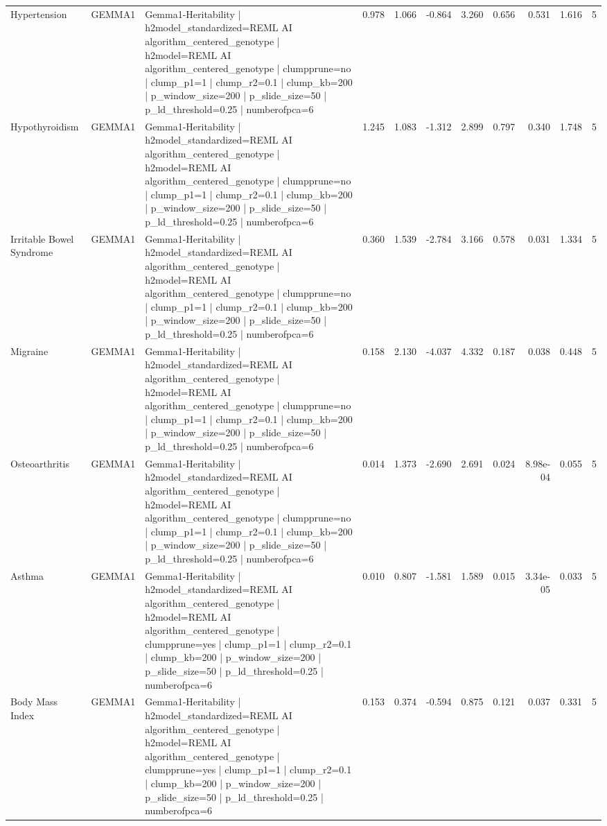 \begin{landscape}
\begin{longtable}{p{2.4cm}p{1.8cm}p{6.0cm}rrrrrrrr}
Hypertension & GEMMA1 & Gemma1-Heritability | h2model\_standardized=REML AI algorithm\_centered\_genotype | h2model=REML AI algorithm\_centered\_genotype | clumpprune=no | clump\_p1=1 | clump\_r2=0.1 | clump\_kb=200 | p\_window\_size=200 | p\_slide\_size=50 | p\_ld\_threshold=0.25 | numberofpca=6 & 0.978 & 1.066 & -0.864 & 3.260 & 0.656 & 0.531 & 1.616 & 5 \\
Hypothyroidism & GEMMA1 & Gemma1-Heritability | h2model\_standardized=REML AI algorithm\_centered\_genotype | h2model=REML AI algorithm\_centered\_genotype | clumpprune=no | clump\_p1=1 | clump\_r2=0.1 | clump\_kb=200 | p\_window\_size=200 | p\_slide\_size=50 | p\_ld\_threshold=0.25 | numberofpca=6 & 1.245 & 1.083 & -1.312 & 2.899 & 0.797 & 0.340 & 1.748 & 5 \\
Irritable Bowel Syndrome & GEMMA1 & Gemma1-Heritability | h2model\_standardized=REML AI algorithm\_centered\_genotype | h2model=REML AI algorithm\_centered\_genotype | clumpprune=no | clump\_p1=1 | clump\_r2=0.1 | clump\_kb=200 | p\_window\_size=200 | p\_slide\_size=50 | p\_ld\_threshold=0.25 | numberofpca=6 & 0.360 & 1.539 & -2.784 & 3.166 & 0.578 & 0.031 & 1.334 & 5 \\
Migraine & GEMMA1 & Gemma1-Heritability | h2model\_standardized=REML AI algorithm\_centered\_genotype | h2model=REML AI algorithm\_centered\_genotype | clumpprune=no | clump\_p1=1 | clump\_r2=0.1 | clump\_kb=200 | p\_window\_size=200 | p\_slide\_size=50 | p\_ld\_threshold=0.25 | numberofpca=6 & 0.158 & 2.130 & -4.037 & 4.332 & 0.187 & 0.038 & 0.448 & 5 \\
Osteoarthritis & GEMMA1 & Gemma1-Heritability | h2model\_standardized=REML AI algorithm\_centered\_genotype | h2model=REML AI algorithm\_centered\_genotype | clumpprune=no | clump\_p1=1 | clump\_r2=0.1 | clump\_kb=200 | p\_window\_size=200 | p\_slide\_size=50 | p\_ld\_threshold=0.25 | numberofpca=6 & 0.014 & 1.373 & -2.690 & 2.691 & 0.024 & 8.98e-04 & 0.055 & 5 \\
Asthma & GEMMA1 & Gemma1-Heritability | h2model\_standardized=REML AI algorithm\_centered\_genotype | h2model=REML AI algorithm\_centered\_genotype | clumpprune=yes | clump\_p1=1 | clump\_r2=0.1 | clump\_kb=200 | p\_window\_size=200 | p\_slide\_size=50 | p\_ld\_threshold=0.25 | numberofpca=6 & 0.010 & 0.807 & -1.581 & 1.589 & 0.015 & 3.34e-05 & 0.033 & 5 \\
Body Mass Index & GEMMA1 & Gemma1-Heritability | h2model\_standardized=REML AI algorithm\_centered\_genotype | h2model=REML AI algorithm\_centered\_genotype | clumpprune=yes | clump\_p1=1 | clump\_r2=0.1 | clump\_kb=200 | p\_window\_size=200 | p\_slide\_size=50 | p\_ld\_threshold=0.25 | numberofpca=6 & 0.153 & 0.374 & -0.594 & 0.875 & 0.121 & 0.037 & 0.331 & 5 \\

\end{longtable}
\end{landscape}
